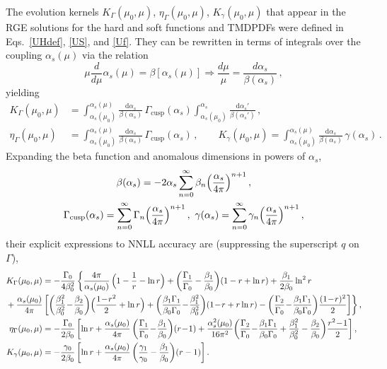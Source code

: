 \documentclass[a4,letterpaper,11pt]{article}
\newcommand{\nn}{\nonumber}
\newcommand{\be}{\begin{equation}}
\newcommand{\ee}{\end{equation}}
\newcommand{\minus}{\!-\!}
\newcommand{\df}{\mathrm{d}}
\newcommand{\as}{\alpha_s}
\newcommand{\cusp}{\mathrm{cusp}}
\newcommand{\Ga}{\Gamma}
\newcommand{\eqss}[3]{Eqs.~\eqref{#1}, \eqref{#2}, and \eqref{#3}}
\begin{document}
The evolution kernels $K_{\Gamma}(\mu_0, \mu)$, $\eta_{\Gamma}(\mu_0, \mu)$, $K_{\gamma} (\mu_0, \mu)$ that appear in the RGE solutions for the hard and soft functions and TMDPDFs were defined in \eqss{UHdef}{US}{Uf}. They can be rewritten in terms of integrals over the coupling $\alpha_s(\mu)$ via the relation
\be
\mu\frac{d}{d\mu} \alpha_s(\mu) = \beta[\alpha_s(\mu)] \Rightarrow \frac{d\mu}{\mu} = \frac{d\as}{\beta(\as)}\,,
\ee
yielding
\begin{align} \label{Keta-def}
K_{\Gamma}(\mu_0, \mu)
&
= \int_{\as(\mu_0)}^{\as(\mu)}\!\frac{\df\as}{\beta(\as)}\,
\Gamma_\cusp(\as) \int_{\as(\mu_0)}^{\as} \frac{\df \as'}{\beta(\as')}
\,,\nn\\
\eta_{\Gamma}(\mu_0, \mu)
&
= \int_{\as(\mu_0)}^{\as(\mu)}\!\frac{\df\as}{\beta(\as)}\, \Gamma_\cusp(\as)
\,, 
\qquad
K_{\gamma}(\mu_0, \mu)
= \int_{\as(\mu_0)}^{\as(\mu)}\!\frac{\df\as}{\beta(\as)}\, \gamma(\as)
\,.\end{align}
Expanding the beta function and anomalous dimensions in powers of $\as$,
\begin{gather}
\label{anomdimexpansions}
\beta(\as) =
- 2 \as \sum_{n=0}^\infty \beta_n\Bigl(\frac{\as}{4\pi}\Bigr)^{n+1}
\,, \\
\Gamma_\cusp(\as) = \sum_{n=0}^\infty \Gamma_n \Bigl(\frac{\as}{4\pi}\Bigr)^{n+1}
\,, \ \gamma(\as) = \sum_{n=0}^\infty \gamma_n \Bigl(\frac{\as}{4\pi}\Bigr)^{n+1}
\,, \nn
\end{gather}
their explicit expressions to NNLL accuracy are (suppressing the superscript $q$ on  $\Ga$),
\begin{align} \label{Keta}
K_\Gamma(\mu_0, \mu) &= -\frac{\Gamma_0}{4\beta_0^2}\,
\biggl\{ \frac{4\pi}{\as(\mu_0)}\, \Bigl(1 - \frac{1}{r} - \ln r\Bigr)
   + \biggl(\frac{\Gamma_1 }{\Gamma_0 } - \frac{\beta_1}{\beta_0}\biggr) (1-r+\ln r)
   + \frac{\beta_1}{2\beta_0} \ln^2 r
\nn\\ & \hspace{-10ex}
+ \frac{\as(\mu_0)}{4\pi}\, \biggl[
  \biggl(\frac{\beta_1^2}{\beta_0^2} \minus \frac{\beta_2}{\beta_0} \biggr) \Bigl(\frac{1 \minus r^2}{2} + \ln r\Bigr)
  + \biggl(\frac{\beta_1\Gamma_1 }{\beta_0 \Gamma_0 } \minus \frac{\beta_1^2}{\beta_0^2} \biggr) (1\minus r+ r\ln r)
  - \biggl(\frac{\Gamma_2 }{\Gamma_0} \minus \frac{\beta_1\Gamma_1}{\beta_0\Gamma_0} \biggr) \frac{(1\minus r)^2}{2}
     \biggr] \biggr\}
\,, \nn\\
\eta_\Gamma(\mu_0, \mu) &=
 - \frac{\Gamma_0}{2\beta_0}\, \biggl[ \ln r
 + \frac{\as(\mu_0)}{4\pi}\, \biggl(\frac{\Gamma_1 }{\Gamma_0 }
 \minus \frac{\beta_1}{\beta_0}\biggr)(r\minus 1)
 + \frac{\as^2(\mu_0)}{16\pi^2} \biggl(
    \frac{\Gamma_2 }{\Gamma_0 } \minus \frac{\beta_1\Gamma_1 }{\beta_0 \Gamma_0 }
      + \frac{\beta_1^2}{\beta_0^2} -\frac{\beta_2}{\beta_0} \biggr) \frac{r^2 \minus 1}{2}
    \biggr]
\,, \nn\\
K_\gamma(\mu_0, \mu) &=
 - \frac{\gamma_0}{2\beta_0}\, \biggl[ \ln r
 + \frac{\as(\mu_0)}{4\pi}\, \biggl(\frac{\gamma_1 }{\gamma_0 }
 - \frac{\beta_1}{\beta_0}\biggr)(r-1) \biggr]
\,.\end{align}
\end{document}
